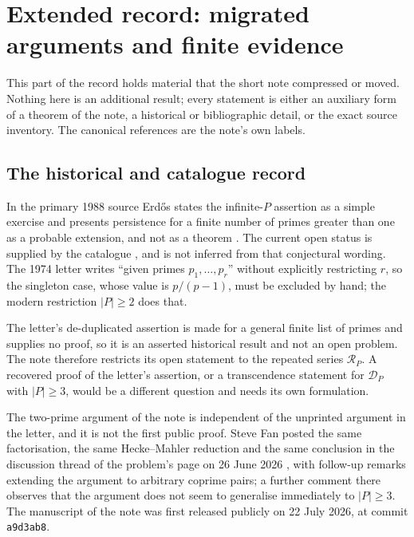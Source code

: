 \documentclass[11pt]{article}
\begin{document}
\section{Extended record: migrated arguments and finite evidence}
\label{long269:long:extended}

This part of the record holds material that the short note compressed or moved.
Nothing here is an additional result; every statement is either an auxiliary
form of a theorem of the note, a historical or bibliographic detail, or the
exact source inventory.  The canonical references are the note's own labels.

\subsection{The historical and catalogue record}\label{long269:long:history}

In the primary 1988 source Erd\H{o}s states the infinite-$P$ assertion as a
simple exercise and presents persistence for a finite number of primes greater
than one as a probable extension, and not as a theorem
\cite[p.~106]{erdos1988}.  The current open status is supplied by the
catalogue \cite{erdosproblems}, and is not inferred from that conjectural
wording.  The 1974 letter writes ``given primes $p_1,\ldots,p_r$'' without
explicitly restricting $r$, so the singleton case, whose value is $p/(p-1)$,
must be excluded by hand; the modern restriction $|P|\ge2$ does that.

The letter's de-duplicated assertion is made for a general finite list of
primes and supplies no proof, so it is an asserted historical result and not an
open problem.  The note therefore restricts its open statement to the repeated
series $\mathcal R_P$.  A recovered proof of the letter's assertion, or a
transcendence statement for $\mathcal D_P$ with $|P|\ge3$, would be a different
question and needs its own formulation.

The two-prime argument of the note is independent of the unprinted argument in
the letter, and it is not the first public proof.  Steve Fan posted the same
factorisation, the same Hecke--Mahler reduction and the same conclusion in the
discussion thread of the problem's page on 26 June 2026
\cite{fan2026comment}, with follow-up remarks extending the argument to
arbitrary coprime pairs; a further comment there observes that the argument
does not seem to generalise immediately to $|P|\ge3$.  The manuscript of the
note was first released publicly on 22 July 2026, at commit \texttt{a9d3ab8}.
\end{document}

